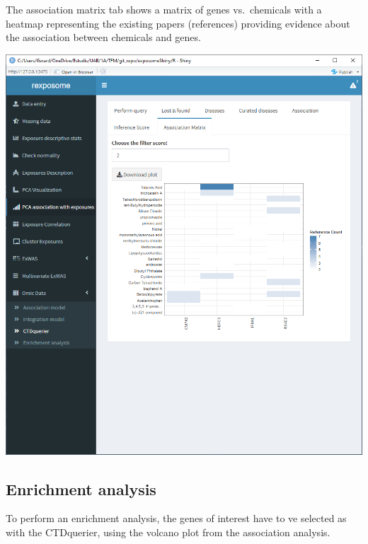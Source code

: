 \documentclass[
]{book}
\begin{document}
The association matrix tab shows a matrix of genes vs.~chemicals with a heatmap representing the existing papers (references) providing evidence about the association between chemicals and genes.

\includegraphics{images/analysis10_9.png}

\hypertarget{enrichment-analysis}{%
\subsection{Enrichment analysis}\label{enrichment-analysis}}

To perform an enrichment analysis, the genes of interest have to ve selected as with the CTDquerier, using the volcano plot from the association analysis.
\end{document}
